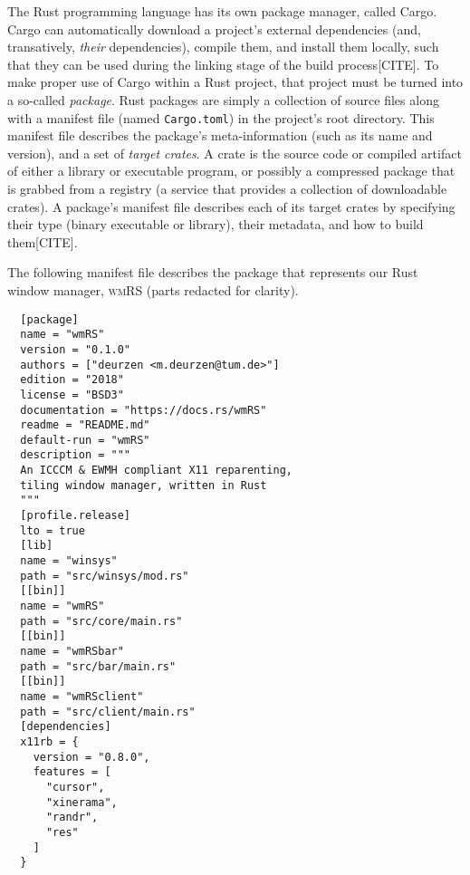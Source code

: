 
The Rust programming  language has its own package manager,  called Cargo. Cargo
can automatically download a project's external dependencies (and, transatively,
\textit{their} dependencies), compile them, and  install them locally, such that
they can be  used during the linking  stage of the build  process[CITE]. To make
proper use of  Cargo within a Rust  project, that project must be  turned into a
so-called  \textit{package}. Rust  packages are  simply a  collection of  source
files along  with a manifest  file (named \texttt{Cargo.toml}) in  the project's
root  directory. This  manifest  file describes  the package's  meta-information
(such as its name and version), and  a set of \textit{target crates}. A crate is
the source code or compiled artifact  of either a library or executable program,
or possibly a compressed package that is grabbed from a registry (a service that
provides  a  collection  of  downloadable crates).  A  package's  manifest  file
describes each of its target crates  by specifying their type (binary executable
or library), their metadata, and how to build them[CITE].

The  following manifest  file describes  the  package that  represents our  Rust
window manager, \textsc{wmRS} (parts redacted for clarity).

\begin{verbatim}
  [package]
  name = "wmRS"
  version = "0.1.0"
  authors = ["deurzen <m.deurzen@tum.de>"]
  edition = "2018"
  license = "BSD3"
  documentation = "https://docs.rs/wmRS"
  readme = "README.md"
  default-run = "wmRS"
  description = """
  An ICCCM & EWMH compliant X11 reparenting,
  tiling window manager, written in Rust
  """
  [profile.release]
  lto = true
  [lib]
  name = "winsys"
  path = "src/winsys/mod.rs"
  [[bin]]
  name = "wmRS"
  path = "src/core/main.rs"
  [[bin]]
  name = "wmRSbar"
  path = "src/bar/main.rs"
  [[bin]]
  name = "wmRSclient"
  path = "src/client/main.rs"
  [dependencies]
  x11rb = {
    version = "0.8.0",
    features = [
      "cursor",
      "xinerama",
      "randr",
      "res"
    ]
  }
\end{verbatim}


